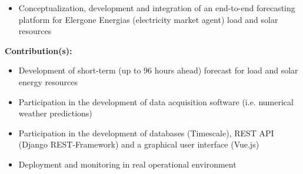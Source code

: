 \documentclass{mycv}
\begin{document}
\begin{myitemize}
		\begin{itemize}[itemsep=1px]
			\item Conceptualization, development and integration of an end-to-end forecasting platform for Elergone Energias (electricity market agent) load and solar resources
		\end{itemize}
		
		\vspace{0.2cm}
		\textbf{Contribution(s):}
		
		\begin{itemize}[itemsep=1px]
			\item Development of short-term (up to 96 hours ahead) forecast for load and solar energy resources
			\item Participation in the development of data acquisition software (i.e. numerical weather predictions)
			\item Participation in the development of databases (Timescale), REST API (Django REST-Framework) and a graphical user interface (Vue.js)
			\item Deployment and monitoring in real operational environment
		\end{itemize}
		
\end{myitemize}	
	\vspace{0.3cm}	
	
\end{document}
